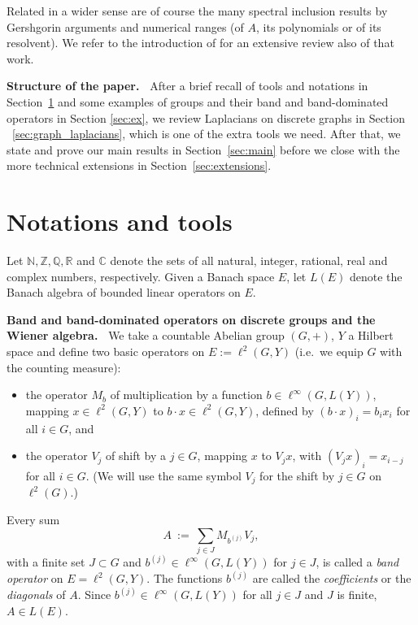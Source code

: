 \documentclass{article}
\providecommand{\blue}{\textcolor{blue}}
\newcommand\C{{\mathbb C}}
\newcommand\N{{\mathbb N}}
\newcommand\Q{{\mathbb Q}}
\newcommand\R{{\mathbb R}}
\newcommand\Z{{\mathbb Z}}
\newtheorem{definition}[theorem]{Definition}
\numberwithin{equation}{section}   %
\numberwithin{figure}{section}  %
\begin{document}
Related in a wider sense are of course the many spectral inclusion results by Gershgorin arguments and numerical ranges (of $A$, its polynomials or of its resolvent). We refer to the introduction of \cite{CW.Heng.ML:JST} for an extensive review also of that work.

\medskip\noindent
{\bf Structure of the paper.\ }
After a brief recall of tools and notations in Section~\ref{sec:tools} and some examples of groups and their band and band-dominated operators in Section \ref{sec:ex}, we review Laplacians on discrete graphs in Section ~\ref{sec:graph_laplacians}, which is one of the extra tools we need. After that, we state and prove our main results in Section~\ref{sec:main} before we close with the more technical extensions in Section~\ref{sec:extensions}.

\section{Notations and tools} \label{sec:tools}
Let $\N,\Z,\Q,\R$ and $\C$ denote the sets of all natural, integer, rational, real and complex numbers, respectively. Given a Banach space $E$, let $L(E)$ denote the Banach algebra of bounded linear operators on $E$.


\medskip\noindent
{\bf Band and band-dominated operators on discrete groups and the Wiener algebra.\ }
We take a countable Abelian group $(G,+)$, $Y$ a Hilbert space and define two basic operators on $E:= \ell^2(G,Y)$ (i.e.\ we equip $G$ with the counting measure):
\begin{itemize}
\item the operator $M_b$ of multiplication by a function $b\in\ell^\infty(G,L(Y))$, mapping $x\in\ell^2(G,Y)$ to $b\cdot x\in\ell^2(G,Y)$, defined by $(b\cdot x)_i=b_i x_i$ for all $i\in G$, and 
\item the operator $V_j$ of shift by a $j\in G$, mapping $x$ to $V_jx$, with $(V_jx)_i=x_{i-j}$ for all $i\in G$. (We will use the same symbol $V_j$ for the shift by $j\in G$ on $\ell^2(G)$.)
\end{itemize}
%
Every sum
\begin{equation} \label{eq:A}
A\ :=\ \sum_{j\in J}M_{b^{(j)}}V_j,
\end{equation}
with a finite set $J\subset G$ and $b^{(j)}\in\ell^\infty(G,L(Y))$ for $j\in J$, is called a {\sl band operator} on $E=\ell^2(G,Y)$. The functions $b^{(j)}$ are called the {\sl coefficients} or the {\sl diagonals} of $A$.
%
Since  $b^{(j)}\in\ell^\infty(G,L(Y))$ for all $j\in J$ and $J$ is finite, $A\in L(E)$.
\end{document}

